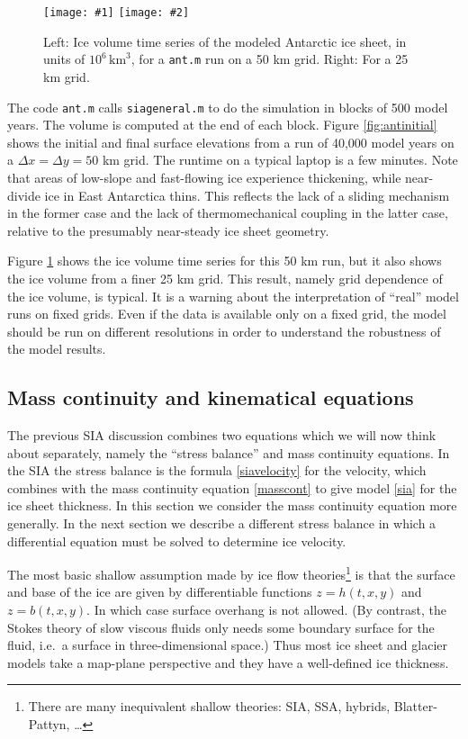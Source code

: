 \documentclass[titlepage,letterpaper,final,12pt]{scrartcl}
\newcommand{\twofigsizes}[5]{
\begin{figure}[ht]
\centering
\texttt{[image: \#1]} \quad
\texttt{[image: \#2]}
\caption{#3}
\label{fig:#1}
\end{figure}}
\newcommand{\twofig}[3]{\twofigsizes{#1}{#2}{#3}{2.5in}{2.5in}}
\begin{document}
\twofig{antvol}{antvol25km}{Left: Ice volume time series of the modeled Antarctic ice sheet, in units of $10^6 \, \text{km}^3$, for a \texttt{ant.m} run on a 50 km grid.  Right:  For a 25 km grid.}

The code \texttt{ant.m} calls \texttt{siageneral.m} to do the simulation in blocks of 500 model years.  The volume is computed at the end of each block.  Figure \ref{fig:antinitial} shows the initial and final surface elevations from a run of 40,000 model years on a $\Delta x = \Delta y = 50$ km grid.  The runtime on a typical laptop is a few minutes.  Note that areas of low-slope and fast-flowing ice experience thickening, while near-divide ice in East Antarctica thins.  This reflects the lack of a sliding mechanism in the former case and the lack of thermomechanical coupling in the latter case, relative to the presumably near-steady ice sheet geometry.

Figure \ref{fig:antvol} shows the ice volume time series for this 50 km run, but it also shows the ice volume from a finer 25 km grid.  This result, namely grid dependence of the ice volume, is typical.  It is a warning about the interpretation of ``real'' model runs on fixed grids.  Even if the data is available only on a fixed grid, the model should be run on different resolutions in order to understand the robustness of the model results.


\subsection{Mass continuity and kinematical equations}

The previous SIA discussion combines two equations which we will now think about separately, namely the ``stress balance'' and mass continuity equations.  In the SIA the stress balance is the formula \eqref{siavelocity} for the velocity, which combines with the mass continuity equation \eqref{masscont} to give model \eqref{sia} for the ice sheet thickness.  In this section we consider the mass continuity equation more generally.  In the next section we describe a different stress balance in which a differential equation must be solved to determine ice velocity.

The most basic shallow assumption made by ice flow theories\footnote{There are many inequivalent shallow theories: SIA, SSA, hybrids, Blatter-Pattyn, \dots} is that the surface and base of the ice are given by differentiable functions $z=h(t,x,y)$ and $z=b(t,x,y)$.  In which case surface overhang is not allowed.  (By contrast, the Stokes theory of slow viscous fluids only needs some boundary surface for the fluid, i.e.~a surface in three-dimensional space.)  Thus most ice sheet and glacier models take a map-plane perspective and they have a well-defined ice thickness.
\end{document}
